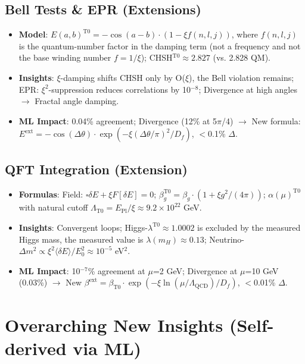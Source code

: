 	\subsection{Bell Tests \& EPR (Extensions)}
	
	\begin{itemize}
		\item \textbf{Model}: $E(a,b)^{\text{T0}} = -\cos(a-b) \cdot (1 - \xi f(n,l,j))$, where $f(n,l,j)$ is the quantum-number factor in the damping term (not a frequency and not the base winding number $f = 1/\xi$); CHSH$^{\text{T0}} \approx 2.827$ (vs. 2.828 QM).
		\item \textbf{Insights}: $\xi$-damping shifts CHSH only by O($\xi$), the Bell violation remains; EPR: $\xi^2$-suppression reduces correlations by 10$^{-8}$; Divergence at high angles $\to$ Fractal angle damping.
		\item \textbf{ML Impact}: 0.04\% agreement; Divergence (12\% at 5$\pi$/4) $\to$ New formula: $E^\text{ext} = -\cos(\Delta\theta) \cdot \exp(-\xi (\Delta\theta/\pi)^2 / D_f)$, $<$0.1\% $\Delta$.
	\end{itemize}
	
	\subsection{QFT Integration (Extension)}
	
	\begin{itemize}
		\item \textbf{Formulas}: Field: $\square \delta E + \xi F[\delta E] = 0$; $\beta_g^{\text{T0}} = \beta_g \cdot (1 + \xi g^2/(4\pi))$; $\alpha(\mu)^{\text{T0}}$ with natural cutoff $\Lambda_{\text{T0}} = E_{\text{Pl}} / \xi \approx 9.2\times10^{22}$ GeV.
		\item \textbf{Insights}: Convergent loops; Higgs-$\lambda^{\text{T0}} \approx 1.0002$ is excluded by the measured Higgs mass, the measured value is $\lambda(m_H) \approx 0.13$; Neutrino-$\Delta m^2 \propto \xi^2 \langle\delta E\rangle / E_0^2 \approx 10^{-5}$ eV$^2$.
		\item \textbf{ML Impact}: 10$^{-7}$\% agreement at $\mu$=2 GeV; Divergence at $\mu$=10 GeV (0.03\%) $\to$ New $\beta^\text{ext} = \beta_{\text{T0}} \cdot \exp(-\xi \ln(\mu/\Lambda_{\text{QCD}})/D_f)$, $<$0.01\% $\Delta$.
	\end{itemize}
	
	\section{Overarching New Insights (Self-derived via ML)}
	
